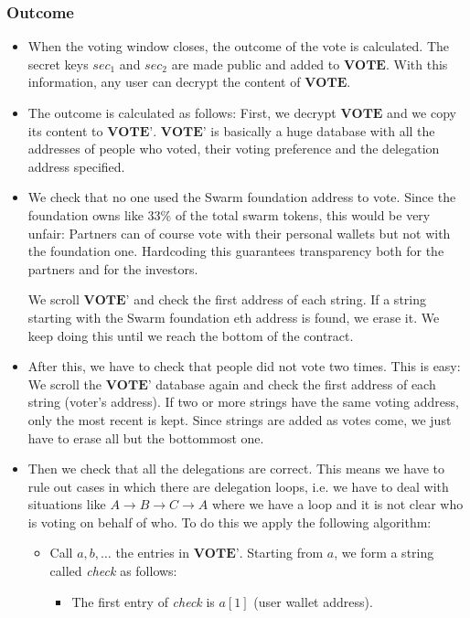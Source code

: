 \documentclass[submission, copyright,creativecommons,sharealike,noncommercial]{eptcs}
\begin{document}
		\subsubsection{Outcome}
			\begin{itemize}
				\item When the voting window closes, the outcome of the vote is calculated. The secret keys $sec_1$ and $sec_2$ are made public and added to $\textbf{VOTE}$. With this information, any user can decrypt the content of $\textbf{VOTE}$.
				
				\item The outcome is calculated as follows: First, we decrypt $\textbf{VOTE}$ and we copy its content to $\textbf{VOTE'}$. $\textbf{VOTE'}$ is basically a huge database with all the addresses of people who voted, their voting preference and the delegation address specified. 
				
				\item We check that no one used the Swarm foundation address to vote. Since the foundation owns like 33\% of the total swarm tokens, this would be very unfair: Partners can of course vote with their personal wallets but not with the foundation one. Hardcoding this guarantees transparency both for the partners and for the investors.
				
				We scroll $\textbf{VOTE'}$ and check the first address of each string. If a string starting with the Swarm foundation eth address is found, we erase it. We keep doing this until we reach the bottom of the contract. 
				
				\item After this, we have to check that people did not vote two times. This is easy: We scroll the $\textbf{VOTE'}$ database again and check the first address of each string (voter's address). If two or more strings have the same voting address, only the most recent is kept. Since strings are added as votes come, we just have to erase all but the bottommost one.
			
				\item Then we check that all the delegations are correct. This means we have to rule out cases in which there are delegation loops, i.e. we have to deal with situations like $A \to B \to C \to A$ where we have a loop and it is not clear who is voting on behalf of who. To do this we apply the following algorithm:
				
				\begin{itemize}
					\item Call $a,b,\dots$ the entries in $\textbf{VOTE'}$. Starting from $a$, we form a string called \emph{check} as follows:
					\begin{itemize}
						\item The first entry of \emph{check} is $a[1]$ (user wallet address).
				

\end{itemize}
\end{itemize}
\end{itemize}
\end{document}
